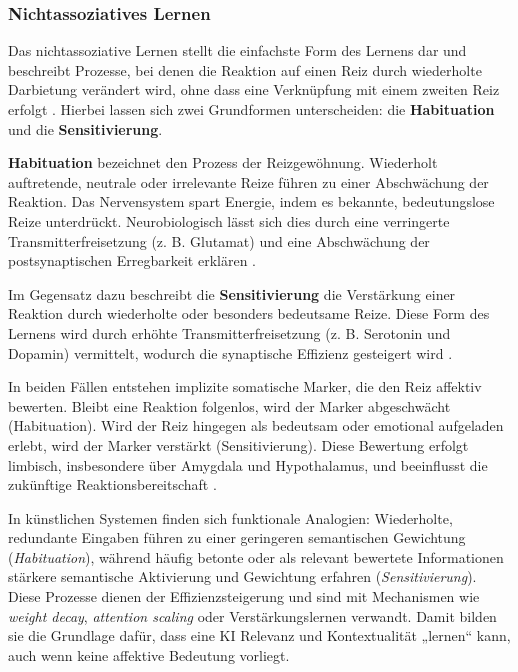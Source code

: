 \subsubsection*{Nichtassoziatives Lernen}

Das nichtassoziative Lernen stellt die einfachste Form des Lernens dar und beschreibt Prozesse, bei denen die Reaktion auf einen Reiz durch wiederholte Darbietung verändert wird, ohne dass eine Verknüpfung mit einem zweiten Reiz erfolgt \cite{Schandry2006}. Hierbei lassen sich zwei Grundformen unterscheiden: die \textbf{Habituation} und die \textbf{Sensitivierung}.

\textbf{Habituation} bezeichnet den Prozess der Reizgewöhnung. Wiederholt auftretende, neutrale oder irrelevante Reize führen zu einer Abschwächung der Reaktion. Das Nervensystem spart Energie, indem es bekannte, bedeutungslose Reize unterdrückt. Neurobiologisch lässt sich dies durch eine verringerte Transmitterfreisetzung (z. B. Glutamat) und eine Abschwächung der postsynaptischen Erregbarkeit erklären \cite{Kandel2001}. 

Im Gegensatz dazu beschreibt die \textbf{Sensitivierung} die Verstärkung einer Reaktion durch wiederholte oder besonders bedeutsame Reize. Diese Form des Lernens wird durch erhöhte Transmitterfreisetzung (z. B. Serotonin und Dopamin) vermittelt, wodurch die synaptische Effizienz gesteigert wird \cite{LeDoux1996, Panksepp1998}.

In beiden Fällen entstehen implizite somatische Marker, die den Reiz affektiv bewerten. Bleibt eine Reaktion folgenlos, wird der Marker abgeschwächt (Habituation). Wird der Reiz hingegen als bedeutsam oder emotional aufgeladen erlebt, wird der Marker verstärkt (Sensitivierung). Diese Bewertung erfolgt limbisch, insbesondere über Amygdala und Hypothalamus, und beeinflusst die zukünftige Reaktionsbereitschaft \cite{Damasio1999}.

In künstlichen Systemen finden sich funktionale Analogien: 
Wiederholte, redundante Eingaben führen zu einer geringeren semantischen Gewichtung (\emph{Habituation}), während häufig betonte oder als relevant bewertete Informationen stärkere semantische Aktivierung und Gewichtung erfahren (\emph{Sensitivierung}). Diese Prozesse dienen der Effizienzsteigerung und sind mit Mechanismen wie \emph{weight decay}, \emph{attention scaling} oder Verstärkungslernen verwandt. Damit bilden sie die Grundlage dafür, dass eine KI Relevanz und Kontextualität „lernen“ kann, auch wenn keine affektive Bedeutung vorliegt.



